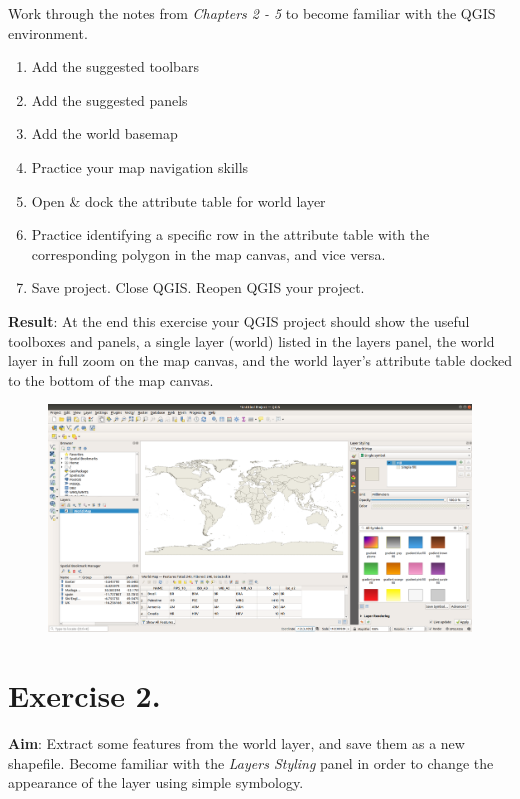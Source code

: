 \documentclass{article}
\begin{document}
Work through the notes from \emph{Chapters 2 - 5} to become familiar with the QGIS environment.

\begin{enumerate}
	\item Add the suggested toolbars
	\item Add the suggested panels
	\item Add the world basemap
	\item Practice your map navigation skills
	\item Open \& dock the attribute table for world layer
	\item Practice identifying a specific row in the attribute table with the corresponding polygon in the map canvas, and vice versa.
	\item Save project. Close QGIS. Reopen QGIS your project.
\end{enumerate}

\textbf{Result}: At the end this exercise your QGIS project should show the useful toolboxes and panels, a single layer (world) listed in the layers panel, the world layer in full zoom on the map canvas, and the world layer's attribute table docked to the bottom of the map canvas.\\


\begin{figure}[!h]
	\centering
	\includegraphics[width=1\textwidth]{images/exercise_1.png}
	\label{ft_fig_firstfig3}
\end{figure}
\newpage

\section{Exercise 2.}
\textbf{Aim}: Extract some features from the world layer, and save them as a new shapefile. Become familiar with the \textit{Layers Styling} panel in order to change the appearance of the layer using simple symbology.\\
\end{document}

